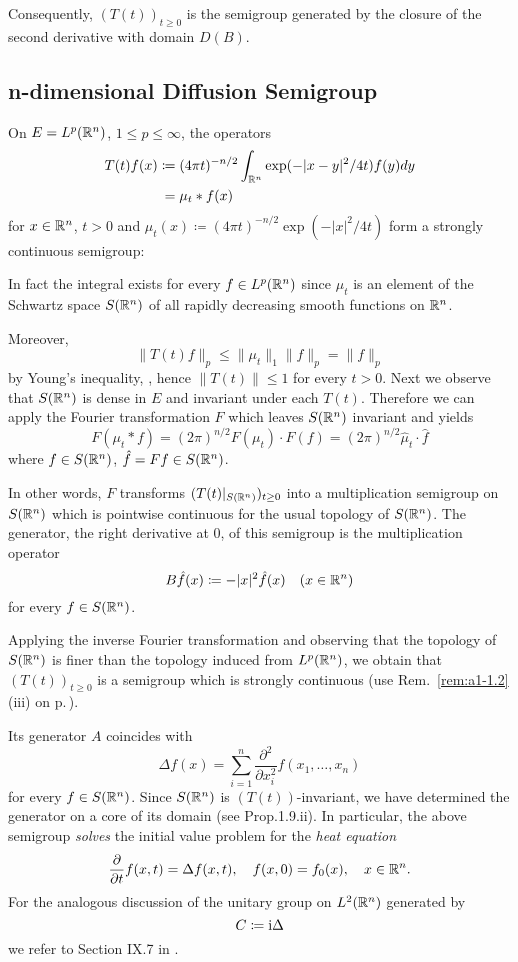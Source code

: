 Consequently, $(T(t))_{t \geq 0}$ is the semigroup generated by the closure of the second derivative with domain $D(B)$.
\subsection{n-dimensional Diffusion Semigroup}\label{subsec:a1-2.8}
On $E = L^{p}(\mathbb{R}^{n})$, $1 \leq p \leq \infty$, the operators
\begin{align*}
    T(t)f(x) \coloneqq{}& (4\pi t)^{-n/2} \int_{\mathbb{R}^{n}} \exp(-|x-y|^{2}/4t)f(y)dy \\
    ={}& \mu_{t}*f(x)
\end{align*}
for $x \in \mathbb{R}^{n}$, $t > 0$ and $\mu_{t}(x) \coloneqq (4\pi t)^{-n/2} \exp(-|x|^{2}/4t)$ form a strongly continuous semigroup:

In fact the integral exists for every $f \in L^{p}(\mathbb{R}^{n})$ since $\mu_{t}$ is an element of the Schwartz space $S(\mathbb{R}^{n})$ of all rapidly decreasing smooth functions on $\mathbb{R}^{n}$.

Moreover,
\[
    \|T(t)f\|_{p} \leq \|\mu_{t}\|_{1}\|f\|_{p} = \|f\|_{p}
\]
by Young's inequality, \citet[p.28]{reedsimon:1975}, hence $\|T(t)\| \leq 1$ for every $t > 0$.
Next we observe that $S(\mathbb{R}^{n})$ is dense in $E$ and invariant under each $T(t)$.
Therefore we can apply the Fourier transformation $F$ which leaves $S(\mathbb{R}^{n})$ invariant and yields
\[
    F(\mu_{t}*f) = (2\pi)^{n/2} F(\mu_{t}) \cdot F(f) = (2\pi)^{n/2} \hat{\mu}_{t}\cdot\hat{f}
\]
where $f \in S(\mathbb{R}^{n})$, $\hat{f} = Ff \in S(\mathbb{R}^{n})$.

In other words, $F$ transforms $(T(t)\vert_{ S(\mathbb{R}^{n})})_{t \geq 0}$ into a multiplication semigroup on $S(\mathbb{R}^{n})$ which is pointwise continuous for the usual topology of $S(\mathbb{R}^{n})$.
The generator, \ie the right derivative at $0$, of this semigroup is the multiplication operator
\[
    B\hat{f}(x) \coloneqq -|x|^{2}\hat{f}(x) \quad (x \in \mathbb{R}^{n})
\]
for every $f \in S(\mathbb{R}^{n})$.

Applying the inverse Fourier transformation and observing that the topology of $S(\mathbb{R}^{n})$ is finer than the topology induced from $L^{p}(\mathbb{R}^{n})$, we obtain that $(T(t))_{t \geq 0}$ is a semigroup which is strongly continuous (use Rem.~\ref{rem:a1-1.2}\,(iii) on p.\,\pageref{rem:a1-1.2}). %

Its generator $A$ coincides with
\[
    \Delta f(x) = \sum_{i=1}^{n} \frac{\partial^{2}}{\partial x_{i}^{2}} f(x_{1},\ldots,x_{n})
\]
for every $f \in S(\mathbb{R}^{n})$.
Since $S(\mathbb{R}^{n})$ is $(T(t))$-invariant, we have determined the generator on a core of its domain (see Prop.1.9.ii).
In particular, the above semigroup \emph{solves} the initial value problem for the \emph{heat equation}
\[
    \frac{\partial}{\partial t} f(x,t) = \Delta f(x,t), \quad f(x,0) = f_{0}(x), \quad x \in \mathbb{R}^{n}.
\]
For the analogous discussion of the unitary group on $L^{2}(\mathbb{R}^{n})$ generated by
\[
    C \coloneqq \mathrm{i}\Delta
\]
we refer to Section IX.7 in \citet{reedsimon:1975}. %

